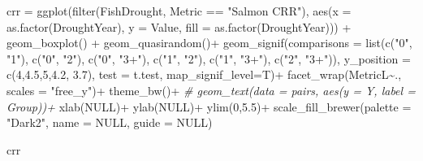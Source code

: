 \documentclass[
]{article}
\newenvironment{Shaded}{\begin{snugshade}}{\end{snugshade}}
\newcommand{\AttributeTok}[1]{\textcolor[rgb]{0.77,0.63,0.00}{#1}}
\newcommand{\CommentTok}[1]{\textcolor[rgb]{0.56,0.35,0.01}{\textit{#1}}}
\newcommand{\ConstantTok}[1]{\textcolor[rgb]{0.00,0.00,0.00}{#1}}
\newcommand{\DecValTok}[1]{\textcolor[rgb]{0.00,0.00,0.81}{#1}}
\newcommand{\FloatTok}[1]{\textcolor[rgb]{0.00,0.00,0.81}{#1}}
\newcommand{\FunctionTok}[1]{\textcolor[rgb]{0.00,0.00,0.00}{#1}}
\newcommand{\NormalTok}[1]{#1}
\newcommand{\OtherTok}[1]{\textcolor[rgb]{0.56,0.35,0.01}{#1}}
\newcommand{\SpecialCharTok}[1]{\textcolor[rgb]{0.00,0.00,0.00}{#1}}
\newcommand{\StringTok}[1]{\textcolor[rgb]{0.31,0.60,0.02}{#1}}
\begin{document}
\begin{Shaded}
\begin{Highlighting}[]
\NormalTok{crr }\OtherTok{=} \FunctionTok{ggplot}\NormalTok{(}\FunctionTok{filter}\NormalTok{(FishDrought, Metric }\SpecialCharTok{==} \StringTok{"Salmon CRR"}\NormalTok{),  }\FunctionTok{aes}\NormalTok{(}\AttributeTok{x =} \FunctionTok{as.factor}\NormalTok{(DroughtYear), }\AttributeTok{y =}\NormalTok{ Value, }\AttributeTok{fill =} \FunctionTok{as.factor}\NormalTok{(DroughtYear))) }\SpecialCharTok{+} 
  \FunctionTok{geom\_boxplot}\NormalTok{() }\SpecialCharTok{+}
  \FunctionTok{geom\_quasirandom}\NormalTok{()}\SpecialCharTok{+}
  \FunctionTok{geom\_signif}\NormalTok{(}\AttributeTok{comparisons =} \FunctionTok{list}\NormalTok{(}\FunctionTok{c}\NormalTok{(}\StringTok{"0"}\NormalTok{, }\StringTok{"1"}\NormalTok{), }\FunctionTok{c}\NormalTok{(}\StringTok{"0"}\NormalTok{, }\StringTok{"2"}\NormalTok{), }\FunctionTok{c}\NormalTok{(}\StringTok{"0"}\NormalTok{, }\StringTok{"3+"}\NormalTok{), }
                                 \FunctionTok{c}\NormalTok{(}\StringTok{"1"}\NormalTok{, }\StringTok{"2"}\NormalTok{), }\FunctionTok{c}\NormalTok{(}\StringTok{"1"}\NormalTok{, }\StringTok{"3+"}\NormalTok{), }\FunctionTok{c}\NormalTok{(}\StringTok{"2"}\NormalTok{, }\StringTok{"3+"}\NormalTok{)), }
              \AttributeTok{y\_position =} \FunctionTok{c}\NormalTok{(}\DecValTok{4}\NormalTok{,}\FloatTok{4.5}\NormalTok{,}\DecValTok{5}\NormalTok{,}\FloatTok{4.2}\NormalTok{, }\FloatTok{3.7}\NormalTok{), }\AttributeTok{test =}\NormalTok{ t.test, }
              \AttributeTok{map\_signif\_level=}\NormalTok{T)}\SpecialCharTok{+}
  \FunctionTok{facet\_wrap}\NormalTok{(MetricL}\SpecialCharTok{\textasciitilde{}}\NormalTok{., }\AttributeTok{scales =} \StringTok{"free\_y"}\NormalTok{)}\SpecialCharTok{+} \FunctionTok{theme\_bw}\NormalTok{()}\SpecialCharTok{+}
 \CommentTok{\# geom\_text(data = pairs, aes(y = Y, label = Group))+}
  \FunctionTok{xlab}\NormalTok{(}\ConstantTok{NULL}\NormalTok{)}\SpecialCharTok{+} \FunctionTok{ylab}\NormalTok{(}\ConstantTok{NULL}\NormalTok{)}\SpecialCharTok{+} \FunctionTok{ylim}\NormalTok{(}\DecValTok{0}\NormalTok{,}\FloatTok{5.5}\NormalTok{)}\SpecialCharTok{+}
  \FunctionTok{scale\_fill\_brewer}\NormalTok{(}\AttributeTok{palette =} \StringTok{"Dark2"}\NormalTok{, }\AttributeTok{name =} \ConstantTok{NULL}\NormalTok{, }\AttributeTok{guide =} \ConstantTok{NULL}\NormalTok{)}

\NormalTok{  crr}
\end{Highlighting}
\end{Shaded}
\end{document}

